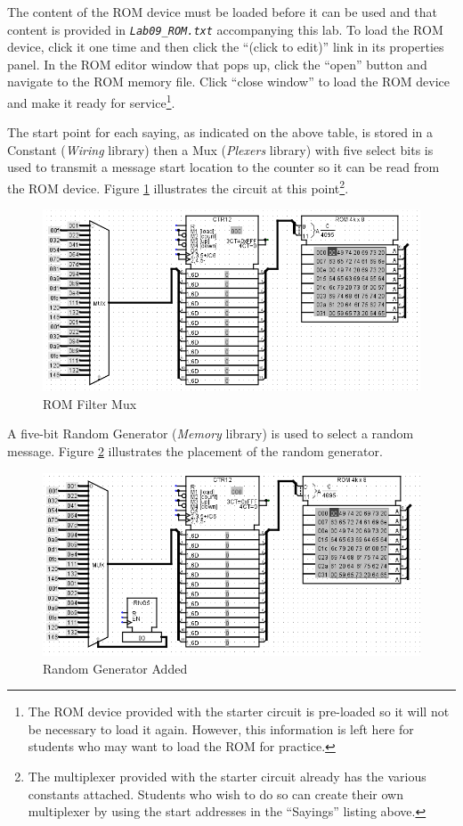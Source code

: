 The content of the ROM device must be loaded before it can be used and that content is provided in \emph{\texttt{Lab09\_ROM.txt}} accompanying this lab. To load the ROM device, click it one time and then click the ``(click to edit)'' link in its properties panel. In the ROM editor window that pops up, click the ``open'' button and navigate to the ROM memory file. Click ``close window'' to load the ROM device and make it ready for service\footnote{The ROM device provided with the starter circuit is pre-loaded so it will not be necessary to load it again. However, this information is left here for students who may want to load the ROM for practice.}.

The start point for each saying, as indicated on the above table, is stored in a Constant (\textit{Wiring} library) then a Mux (\textit{Plexers} library) with five select bits is used to transmit a message start location to the counter so it can be read from the ROM device. Figure \ref{fig:rom-04} illustrates the circuit at this point\footnote{The multiplexer provided with the starter circuit already has the various constants attached. Students who wish to do so can create their own multiplexer by using the start addresses in the ``Sayings'' listing above.}.

\begin{figure}[H]
	\centering
	\includegraphics[width=\maxwidth{.95\linewidth}]{gfx/rom-04}
	\caption{ROM Filter Mux}
	\label{fig:rom-04}
\end{figure}

A five-bit Random Generator (\textit{Memory} library) is used to select a random message. Figure \ref{fig:rom-05} illustrates the placement of the random generator.

\begin{figure}[H]
	\centering
	\includegraphics[width=\maxwidth{.95\linewidth}]{gfx/rom-05}
	\caption{Random Generator Added}
	\label{fig:rom-05}
\end{figure}

